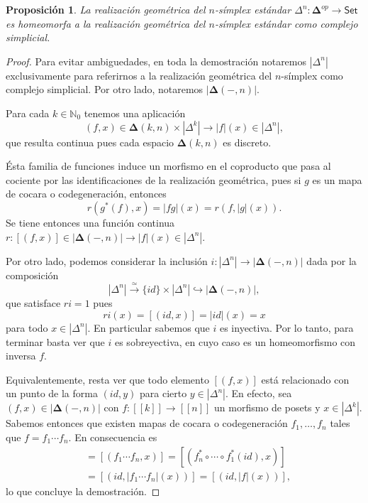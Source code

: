 \documentclass[11pt]{report}
\theoremstyle{colored}
\newtheorem{proposition}{Proposición}[section]
\newcommand{\N}{\mathbb{N}}
\newcommand{\nat}[1]{[\![#1]\!]}
\newcommand{\ord}[1]{\nat{#1}}
\newcommand{\cat}[1]{\mathsf{#1}}
\renewcommand{\ss}[1]{\Delta^{#1}}
\newcommand{\ordcat}{\boldsymbol{\Delta}}
\begin{document}
\begin{proposition} La realización geométrica del $n$-símplex estándar $\ss{n} :\ordcat^{op} \to \cat{Set}$ es homeomorfa a la realización geométrica del $n$-símplex estándar como complejo simplicial.
\end{proposition}
\begin{proof} Para evitar ambiguedades, en toda la demostración notaremos $|\ss{n}|$ exclusivamente para referirnos a la realización geométrica del $n$-símplex como complejo simplicial. Por otro lado, notaremos $|\ordcat(-,n)|$.

Para cada $k \in \N_0$ tenemos una aplicación
\[
(f,x) \in \ordcat(k,n) \times |\Delta^k| \to |f|(x) \in |\Delta^n|,
\]
que resulta continua pues cada espacio $\ordcat(k,n)$ es discreto.

Ésta familia de funciones induce un morfismo en el coproducto que pasa al cociente por las identificaciones de la realización geométrica, pues si $g$ es un mapa de cocara o codegeneración, entonces
\[
r(g^*(f),x) = |fg|(x) = r(f,|g|(x)).
\]
Se tiene entonces una función continua $r : [(f,x)] \in |\ordcat(-,n)| \to |f|(x) \in |\Delta^n|$. 

Por otro lado, podemos considerar la inclusión $i : |\ss{n}| \to |\ordcat(-,n)|$ dada por la composición
\[
|\ss{n}| \xrightarrow{\simeq} \{id\} \times |\ss{n}| \hookrightarrow |\ordcat(-,n)|,
\]
que satisface $ri = 1$ pues
\[
ri(x) = [(id,x)] = |id|(x) = x
\]
para todo $x \in |\ss{n}|$. En particular sabemos que $i$ es inyectiva. Por lo tanto, para terminar basta ver que $i$ es sobreyectiva, en cuyo caso es un homeomorfismo con inversa $f$.

Equivalentemente, resta ver que todo elemento $[(f,x)]$ está relacionado con un punto de la forma $(id,y)$ para cierto $y \in |\ss{n}|$. En efecto, sea $(f,x) \in |\ordcat(-,n)|$ con $f : \ord{k} \to \ord{n}$ un morfismo de posets y $x \in |\ss{k}|$. Sabemos entonces que existen mapas de cocara o codegeneración $f_1, \dots, f_n$ tales que $f = f_1 \cdots f_n$. En consecuencia es
\begin{align*}
[(f,x)] &= [(f_1 \cdots f_n, x)] = [(f_n^* \circ \cdots \circ f_1^*(id), x)]\\ &= [(id,|f_1 \cdots f_n|(x))] = [(id, |f|(x))],
\end{align*}
lo que concluye la demostración.
\end{proof}
\end{document}
